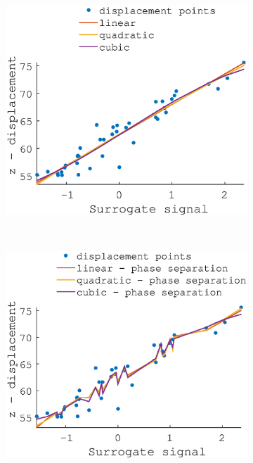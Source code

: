 \documentclass[11pt,a4paper,oneside]{report}
\begin{document}
\begin{figure}
  
    \hspace*{-2em}
  \begin{subfigure}[b]{0.33\textwidth}
    \includegraphics[width=\textwidth, trim=0 0 0 110,clip=true]{figures/task2/fit_round1_couch5.eps}
  \end{subfigure}%
    ~ %
  \begin{subfigure}[b]{0.33\textwidth}
    \includegraphics[width=\textwidth, trim=0 0 0 110,clip=true]{figures/task2/fit_round2_couch5.eps}

\end{subfigure}
\end{figure}
\end{document}
